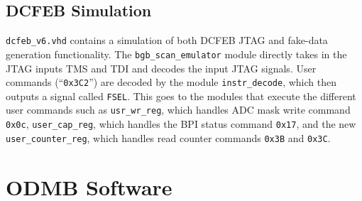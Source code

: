 \documentclass[10pt,a4paper]{article}
\begin{document}
\subsection{DCFEB Simulation}

\texttt{dcfeb\_v6.vhd} contains a simulation of both DCFEB JTAG and fake-data generation functionality. The \texttt{bgb\_scan\_emulator} module directly takes in the JTAG inputs TMS and TDI and decodes the input JTAG signals. User commands (``\texttt{0x3C2}'') are decoded by the module \texttt{instr\_decode}, which then outputs a signal called \texttt{FSEL}. This goes to the modules that execute the different user commands such as \texttt{usr\_wr\_reg}, which handles ADC mask write command \texttt{0x0c}, \texttt{user\_cap\_reg}, which handles the BPI status command \texttt{0x17}, and the new \texttt{user\_counter\_reg}, which handles read counter commands \texttt{0x3B} and \texttt{0x3C}.

\section{ODMB Software}
%
%

%
\end{document}
